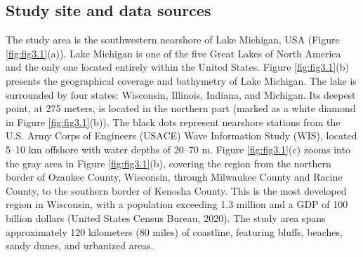 \subsection{Study site and data sources}
\label{c3_Study site and data sources}

The study area is the southwestern nearshore of Lake Michigan, USA (Figure
\ref{fig:fig3.1}(a)). Lake Michigan is one of the five Great Lakes of North
America and the only one located entirely within the United States. Figure
\ref{fig:fig3.1}(b) presents the geographical coverage and bathymetry of Lake
Michigan. The lake is surrounded by four states: Wisconsin, Illinois, Indiana,
and Michigan. Its deepest point, at 275 meters, is located in the northern part
(marked as a white diamond in Figure \ref{fig:fig3.1}(b)). The black dots
represent nearshore stations from the U.S. Army Corps of Engineers (USACE) Wave
Information Study (WIS), located 5–10 km offshore with water depths of 20–70 m.
Figure \ref{fig:fig3.1}(c) zooms into the gray area in Figure
\ref{fig:fig3.1}(b), covering the region from the northern border of Ozaukee
County, Wisconsin, through Milwaukee County and Racine County, to the southern
border of Kenosha County. This is the most developed region in Wisconsin, with a
population exceeding 1.3 million and a GDP of 100 billion dollars (United States
Census Bureau, 2020). The study area spans approximately 120 kilometers (80
miles) of coastline, featuring bluffs, beaches, sandy dunes, and urbanized
areas. 


